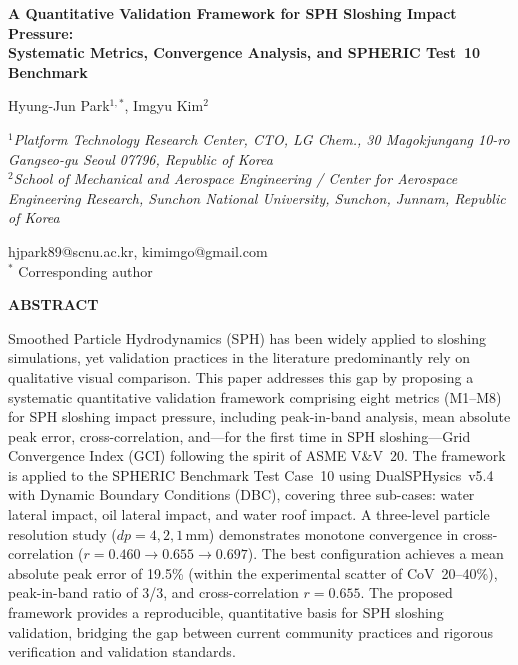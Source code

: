 \documentclass[11pt]{article}
\begin{document}
\begin{center}
\textbf{\Large
A Quantitative Validation Framework for SPH Sloshing Impact Pressure: \\
Systematic Metrics, Convergence Analysis, and SPHERIC Test~10 Benchmark}

\bigskip

Hyung-Jun Park$^{1, *}$, Imgyu Kim$^{2}$\\
\bigskip
\small{
\textit{
$^1$Platform Technology Research Center, CTO, LG Chem., 30 Magokjungang 10-ro Gangseo-gu Seoul 07796, Republic of Korea\\[3pt]
$^2$School of Mechanical and Aerospace Engineering / Center for Aerospace Engineering Research, Sunchon National University, Sunchon, Junnam, Republic of Korea
}

\bigskip

\bigskip

hjpark89@scnu.ac.kr, kimimgo@gmail.com  \\
$^*$ Corresponding author
}
\end{center}

\bigskip

\begin{center}
\textbf{ABSTRACT }\\
\bigskip
\begin{minipage}{0.9\textwidth}
Smoothed Particle Hydrodynamics (SPH) has been widely applied to sloshing
simulations, yet validation practices in the literature predominantly rely on
qualitative visual comparison.
This paper addresses this gap by proposing a systematic quantitative validation
framework comprising eight metrics (M1--M8) for SPH sloshing impact pressure,
including peak-in-band analysis, mean absolute peak error, cross-correlation,
and---for the first time in SPH sloshing---Grid Convergence Index (GCI)
following the spirit of ASME V\&V~20.
The framework is applied to the SPHERIC Benchmark Test Case~10 using
DualSPHysics~v5.4 with Dynamic Boundary Conditions (DBC), covering three
sub-cases: water lateral impact, oil lateral impact, and water roof impact.
A three-level particle resolution study ($dp = 4, 2, 1$\,mm) demonstrates
monotone convergence in cross-correlation ($r = 0.460 \to 0.655 \to 0.697$).
The best configuration achieves a mean absolute peak error of 19.5\%
(within the experimental scatter of CoV~20--40\%), peak-in-band ratio of 3/3,
and cross-correlation $r = 0.655$.
The proposed framework provides a reproducible, quantitative basis for SPH
sloshing validation, bridging the gap between current community practices and
rigorous verification and validation standards.
\end{minipage}
\end{center}
\end{document}
